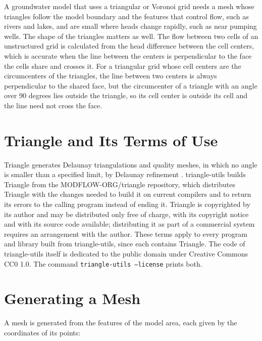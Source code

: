 \documentclass[11pt,twoside,twocolumn]{usgsreport}
\begin{document}
A groundwater model that uses a triangular or Voronoi grid needs a mesh whose triangles follow the model boundary and the features that control flow, such as rivers and lakes, and are small where heads change rapidly, such as near pumping wells. The shape of the triangles matters as well. The flow between two cells of an unstructured grid is calculated from the head difference between the cell centers, which is accurate when the line between the centers is perpendicular to the face the cells share and crosses it. For a triangular grid whose cell centers are the circumcenters of the triangles, the line between two centers is always perpendicular to the shared face, but the circumcenter of a triangle with an angle over 90 degrees lies outside the triangle, so its cell center is outside its cell and the line need not cross the face.

\section{Triangle and Its Terms of Use}

Triangle generates Delaunay triangulations and quality meshes, in which no angle is smaller than a specified limit, by Delaunay refinement \citep{shewchuk2002delaunay}. triangle-utils builds Triangle from the MODFLOW-ORG/triangle repository, which distributes Triangle with the changes needed to build it on current compilers and to return its errors to the calling program instead of ending it. Triangle is copyrighted by its author and may be distributed only free of charge, with its copyright notice and with its source code available; distributing it as part of a commercial system requires an arrangement with the author. These terms apply to every program and library built from triangle-utils, since each contains Triangle. The code of triangle-utils itself is dedicated to the public domain under Creative Commons CC0 1.0. The command \texttt{triangle-utils --license} prints both.

\section{Generating a Mesh}

A mesh is generated from the features of the model area, each given by the coordinates of its points:
\end{document}
